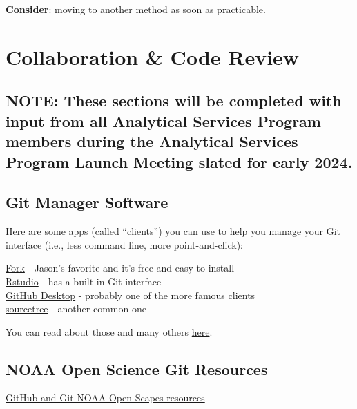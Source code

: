 \documentclass[
  letterpaper,
  DIV=11,
  numbers=noendperiod]{scrreprt}
\begin{document}
\textbf{Consider}: moving to another method as soon as practicable.


\chapter{Collaboration \& Code Review}\label{collaborate.qmd}

\section{NOTE: These sections will be completed with input from all
Analytical Services Program members during the Analytical Services
Program Launch Meeting slated for early
2024.}\label{note-these-sections-will-be-completed-with-input-from-all-analytical-services-program-members-during-the-analytical-services-program-launch-meeting-slated-for-early-2024.}

\section{Git Manager Software}\label{git-manager-software}

Here are some apps (called
``\href{https://en.wikipedia.org/wiki/Client_(computing)}{clients}'')
you can use to help you manage your Git interface (i.e., less command
line, more point-and-click):

\href{https://git-fork.com/}{Fork} - Jason's favorite and it's free and
easy to install\\
\href{https://geo.uzh.ch/microsite/reproducible_research/post/rr-rstudio-git/}{Rstudio}
- has a built-in Git interface\\
\href{https://desktop.github.com/}{GitHub Desktop} - probably one of the
more famous clients\\
\href{https://www.sourcetreeapp.com/}{sourcetree} - another common one

You can read about those and many others
\href{https://blog.devart.com/best-git-gui-clients-for-windows.html\#GitHub-Desktop}{here}.

\section{NOAA Open Science Git
Resources}\label{noaa-open-science-git-resources}

\href{https://nmfs-opensci.github.io/GitHub-Guide/\#sec-introduction}{GitHub
and Git NOAA Open Scapes resources}
\end{document}
